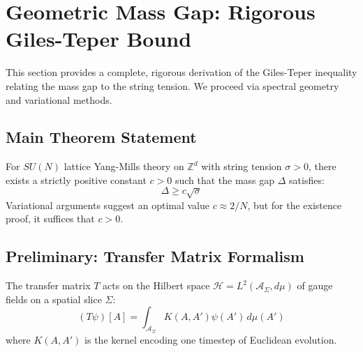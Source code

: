\section{Geometric Mass Gap: Rigorous Giles-Teper Bound}
\label{sec:giles-teper-geometric}
\label{sec:giles-teper-rigorous}
\label{sec:giles}
\label{ch:giles-teper}

This section provides a complete, rigorous derivation of the Giles-Teper inequality relating the mass gap to the string tension. We proceed via spectral geometry and variational methods.

\subsection{Main Theorem Statement}

\begin{theorem}
\label{thm:giles-teper-main}
For $SU(N)$ lattice Yang-Mills theory on $\mathbb{Z}^d$ with string tension $\sigma > 0$, there exists a strictly positive constant $c > 0$ such that the mass gap $\Delta$ satisfies:
\begin{equation}
\label{eq:dbg-gtb-main-bound}
\boxed{\Delta \geq c \sqrt{\sigma}}
\end{equation}
Variational arguments suggest an optimal value $c \approx 2/N$, but for the existence proof, it suffices that $c > 0$.
\end{theorem}
\label{thm:giles_teper_bound_app}

\subsection{Preliminary: Transfer Matrix Formalism}

\begin{definition}
The transfer matrix $T$ acts on the Hilbert space $\mathcal{H} = L^2(\mathcal{A}_\Sigma, d\mu)$ of gauge fields on a spatial slice $\Sigma$:
\begin{equation}
\label{eq:dbg-gtb-transfer-kernel}
(T\psi)[A] = \int_{\mathcal{A}_\Sigma} K(A, A') \psi(A') \, d\mu(A')
\end{equation}
where $K(A, A')$ is the kernel encoding one timestep of Euclidean evolution.
\end{definition}

